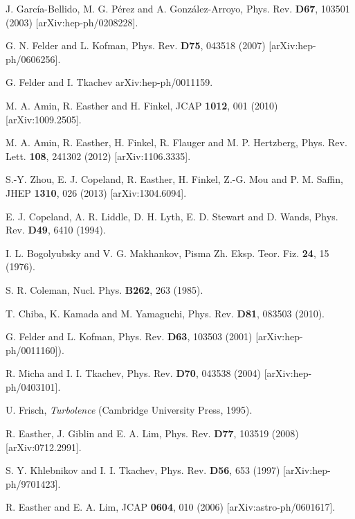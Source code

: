 \documentclass[11pt,a4paper,twoside]{book}
\begin{document}
\begin{thebibliography}{2}
	 J. Garc\'{i}a-Bellido, M. G. P\'{e}rez and A. Gonz\'{a}lez-Arroyo, Phys. Rev. \textbf{D67}, 103501 (2003) [arXiv:hep-ph/0208228].
	
	 G. N. Felder and L. Kofman, Phys. Rev. \textbf{D75}, 043518 (2007) [arXiv:hep-ph/0606256].
	
	 G. Felder and I. Tkachev arXiv:hep-ph/0011159.
	
	 M. A. Amin, R. Easther and H. Finkel, JCAP \textbf{1012}, 001 (2010) [arXiv:1009.2505].
	
	 M. A. Amin, R. Easther, H. Finkel, R. Flauger and M. P. Hertzberg, Phys. Rev. Lett. \textbf{108}, 241302 (2012) [arXiv:1106.3335].
	
	 S.-Y. Zhou, E. J. Copeland, R. Easther, H. Finkel, Z.-G. Mou and P. M. Saffin, JHEP \textbf{1310}, 026 (2013) [arXiv:1304.6094].
	
	 E. J. Copeland, A. R. Liddle, D. H. Lyth, E. D. Stewart and D. Wands, Phys. Rev. \textbf{D49}, 6410 (1994).
	
	 I. L. Bogolyubsky and V. G. Makhankov, Pisma Zh. Eksp. Teor. Fiz. \textbf{24}, 15 (1976).

	 S. R. Coleman, Nucl. Phys. \textbf{B262}, 263 (1985). 	

	T. Chiba, K. Kamada and M. Yamaguchi, Phys. Rev. \textbf{D81}, 083503 (2010).	
	
	 G. Felder and L. Kofman, Phys. Rev. \textbf{D63}, 103503 (2001) [arXiv:hep-ph/0011160]).
	
	 R. Micha and I. I. Tkachev, Phys. Rev. \textbf{D70}, 043538 (2004) [arXiv:hep-ph/0403101].
	
	 U. Frisch, \textit{Turbolence} (Cambridge University Press, 1995).
	
	 R. Easther, J. Giblin and E. A. Lim, Phys. Rev. \textbf{D77}, 103519 (2008) [arXiv:0712.2991].
	
	 S. Y. Khlebnikov and I. I. Tkachev, Phys. Rev. \textbf{D56}, 653 (1997) [arXiv:hep-ph/9701423].
	
	 R. Easther and E. A. Lim, JCAP \textbf{0604}, 010 (2006) [arXiv:astro-ph/0601617].
	

\end{thebibliography}
\end{document}
